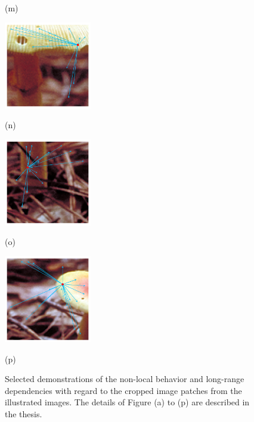 \begin{figure}[]
\begin{minipage}[t]{.24\linewidth}
			\centerline{(m)}
			\label{SHROOM-1}
		\end{minipage}
		\begin{minipage}[t]{.24\linewidth}
			\includegraphics[width=1.5in]{cropped/shroom_superpixel_5.jpg}
			\centerline{(n)}
			\label{SHROOM-2}
		\end{minipage}
		\begin{minipage}[t]{.24\linewidth}
			\includegraphics[width=1.5in]{cropped/shroom_superpixel_13.jpg}
			\centerline{(o)}
			\label{SHROOM-3}
		\end{minipage}
		\begin{minipage}[t]{.24\linewidth}
			\includegraphics[width=1.5in]{cropped/shroom_superpixel_15.jpg}
			\centerline{(p)}
			\label{SHROOM-4}
		\end{minipage}
		\caption{Selected demonstrations of the non-local behavior and long-range dependencies with regard to the cropped image patches from the illustrated images. The details of Figure (a) to (p) are described in the thesis.}
		\label{Non-local Behavior of the cropped patches}
	\end{figure}
	
